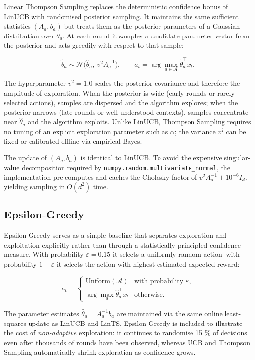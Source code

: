 Linear Thompson Sampling \citep{Agrawal2013} replaces the deterministic confidence bonus of LinUCB with randomised posterior sampling. It maintains the same sufficient statistics \((A_a, b_a)\) but treats them as the posterior parameters of a Gaussian distribution over \(\theta_a\). At each round it samples a candidate parameter vector from the posterior and acts greedily with respect to that sample:

\[\tilde\theta_a \sim \mathcal{N}\bigl( \hat\theta_a,\; v^2 A_a^{-1} \bigr), \qquad a_t = \arg\max_{a \in \mathcal{A}} \tilde\theta_a^\top x_t.\]

The hyperparameter \(v^2 = 1.0\) scales the posterior covariance and therefore the amplitude of exploration. When the posterior is wide (early rounds or rarely selected actions), samples are dispersed and the algorithm explores; when the posterior narrows (late rounds or well-understood contexts), samples concentrate near \(\hat\theta_a\) and the algorithm exploits. Unlike LinUCB, Thompson Sampling requires no tuning of an explicit exploration parameter such as \(\alpha\); the variance \(v^2\) can be fixed or calibrated offline via empirical Bayes.

The update of \((A_a, b_a)\) is identical to LinUCB. To avoid the expensive singular-value decomposition required by \texttt{numpy.random.multivariate\_normal}, the implementation pre-computes and caches the Cholesky factor of \(v^2 A_a^{-1} + 10^{-6} I_d\), yielding sampling in \(O(d^2)\) time.

\subsection{Epsilon-Greedy}\label{epsilon-greedy}

Epsilon-Greedy serves as a simple baseline that separates exploration and exploitation explicitly rather than through a statistically principled confidence measure. With probability \(\varepsilon = 0.15\) it selects a uniformly random action; with probability \(1 - \varepsilon\) it selects the action with highest estimated expected reward:

\[a_t = \begin{cases} \text{Uniform}(\mathcal{A}) & \text{with probability } \varepsilon, \\ \arg\max_a \hat\theta_a^\top x_t & \text{otherwise}. \end{cases}\]

The parameter estimates \(\hat\theta_a = A_a^{-1} b_a\) are maintained via the same online least-squares update as LinUCB and LinTS. Epsilon-Greedy is included to illustrate the cost of \emph{non-adaptive} exploration: it continues to randomise 15 \% of decisions even after thousands of rounds have been observed, whereas UCB and Thompson Sampling automatically shrink exploration as confidence grows.

